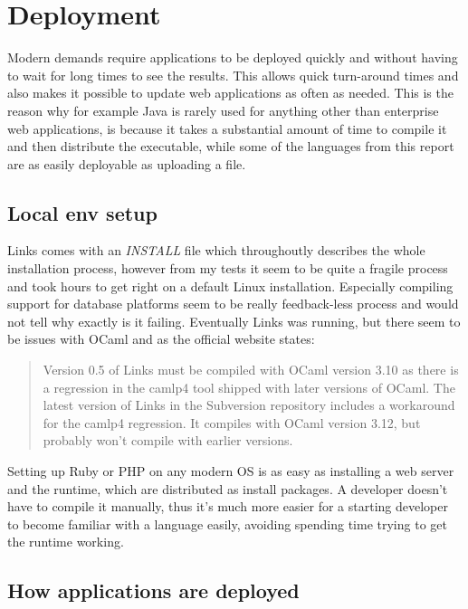 \chapter{Deployment}

Modern demands require applications to be deployed quickly and without having to wait for long times to see the results. This allows quick turn-around times and also makes it possible to update web applications as often as needed. This is the reason why for example Java is rarely used for anything other than enterprise web applications, is because it takes a substantial amount of time to compile it and then distribute the executable, while some of the languages from this report are as easily deployable as uploading a file.

\section{Local env setup}

Links comes with an \textit{INSTALL} file which throughoutly describes the whole installation process, however from my tests it seem to be quite a fragile process and took hours to get right on a default Linux installation. Especially compiling support for database platforms seem to be really feedback-less process and would not tell why exactly is it failing. Eventually Links was running, but there seem to be issues with OCaml and as the official website states: 

\begin{quote}
Version 0.5 of Links must be compiled with OCaml version 3.10 as there is a regression in the camlp4 tool shipped with later versions of OCaml. The latest version of Links in the Subversion repository includes a workaround for the camlp4 regression. It compiles with OCaml version 3.12, but probably won't compile with earlier versions.
\end{quote}

Setting up Ruby or PHP on any modern OS is as easy as installing a web server and the runtime, which are distributed as install packages. A developer doesn't have to compile it manually, thus it's much more easier for a starting developer to become familiar with a language easily, avoiding spending time trying to get the runtime working.

\section{How applications are deployed}

